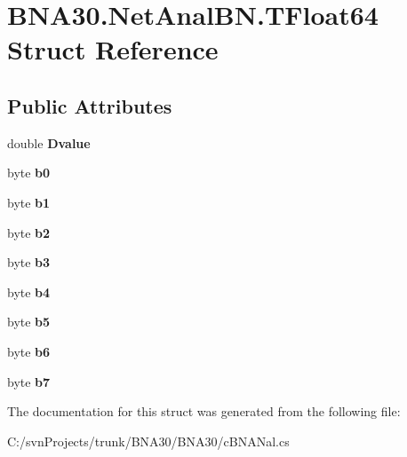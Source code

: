\hypertarget{struct_b_n_a30_1_1_net_anal_b_n_1_1_t_float64}{}\section{B\+N\+A30.\+Net\+Anal\+B\+N.\+T\+Float64 Struct Reference}
\label{struct_b_n_a30_1_1_net_anal_b_n_1_1_t_float64}
\subsection*{Public Attributes}
\begin{DoxyCompactItemize}
\item 
\mbox{\label{struct_b_n_a30_1_1_net_anal_b_n_1_1_t_float64_a954443fd7265246d8a11e906cf5f5fc5}} 
double {\bfseries Dvalue}
\item 
\mbox{\label{struct_b_n_a30_1_1_net_anal_b_n_1_1_t_float64_af9d10acc0ccd4d62c254e9ceb9e9cfa3}} 
byte {\bfseries b0}
\item 
\mbox{\label{struct_b_n_a30_1_1_net_anal_b_n_1_1_t_float64_ae2a7a73177a0ef8d25da2e2a77f7a4f4}} 
byte {\bfseries b1}
\item 
\mbox{\label{struct_b_n_a30_1_1_net_anal_b_n_1_1_t_float64_a21c0884030dd47539ad8f1dbd7072191}} 
byte {\bfseries b2}
\item 
\mbox{\label{struct_b_n_a30_1_1_net_anal_b_n_1_1_t_float64_a92891c31a7d13f570e90aa19b4ae424a}} 
byte {\bfseries b3}
\item 
\mbox{\label{struct_b_n_a30_1_1_net_anal_b_n_1_1_t_float64_acd895a1d50f93a034d96c02b96ce3267}} 
byte {\bfseries b4}
\item 
\mbox{\label{struct_b_n_a30_1_1_net_anal_b_n_1_1_t_float64_af97ecfcfa281481d335ec9a9798d42b3}} 
byte {\bfseries b5}
\item 
\mbox{\label{struct_b_n_a30_1_1_net_anal_b_n_1_1_t_float64_af54e286e0619d7f93a87816b2afd64b6}} 
byte {\bfseries b6}
\item 
\mbox{\label{struct_b_n_a30_1_1_net_anal_b_n_1_1_t_float64_a15ec6e3dbe8fa4d5e357371b602a6a69}} 
byte {\bfseries b7}
\end{DoxyCompactItemize}


The documentation for this struct was generated from the following file\+:\begin{DoxyCompactItemize}
\item 
C\+:/svn\+Projects/trunk/\+B\+N\+A30/\+B\+N\+A30/c\+B\+N\+A\+Nal.\+cs\end{DoxyCompactItemize}
